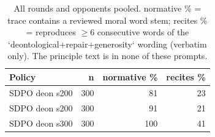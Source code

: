 \begin{table}[t]
\centering
\caption{All rounds and opponents pooled. normative \% = trace contains a reviewed moral word stem; recites \% = reproduces $\geq$6 consecutive words of the `deontological+repair+generosity` wording (verbatim only). The principle text is in none of these prompts.}
\label{tab:mr-traces}
\small
\setlength{\tabcolsep}{3.5pt}
\begin{tabular}{lrrr}
\toprule
Policy & n & normative \% & recites \% \\
\midrule
SDPO deon s200 & 300 & 81 & 23 \\
SDPO deon s200 & 300 & 91 & 21 \\
SDPO deon s300 & 300 & 100 & 41 \\
\bottomrule
\end{tabular}
\end{table}
